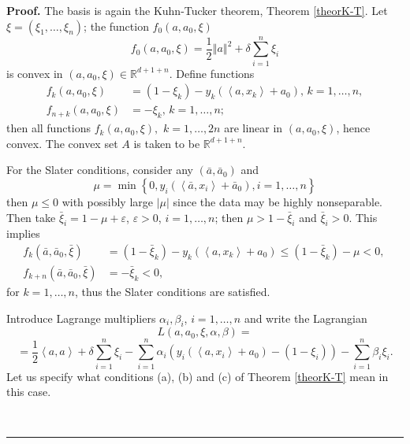 \documentclass[11pt,twoside]{article}%
\theoremstyle{change}
\newenvironment{proof}[1][Proof]{\textbf{#1.} }{\ \rule{0.5em}{0.5em}}
\begin{document}
\begin{proof}
The basis is again the Kuhn-Tucker theorem, Theorem \ref{theorK-T}. Let
$\xi=(\xi_{1},\ldots,\xi_{n})$; the function $f_{0}(a,a_{0},\xi)$
\[
f_{0}(a,a_{0},\xi)=\frac{1}{2}\left\Vert a\right\Vert ^{2}+\delta\sum
_{i=1}^{n}\xi_{i}%
\]
is convex in $(a,a_{0},\xi)\in\mathbb{R}^{d+1+n}$. Define functions
\begin{align*}
f_{k}(a,a_{0},\xi)  & =\left(  1-\xi_{k}\right)  -y_{k}\left(  \left\langle
a,x_{k}\right\rangle +a_{0}\right)  \text{, }k=1,\ldots,n,\\
f_{n+k}(a,a_{0},\xi)  & =-\xi_{k}\text{, }k=1,\ldots,n\text{;}%
\end{align*}
then all functions $f_{k}(a,a_{0},\xi),$ $k=1,\ldots,2n$ are linear in
$(a,a_{0},\xi)$, hence convex. The convex set $A$ is taken to be
$\mathbb{R}^{d+1+n}$.

For the Slater conditions, consider any $(\bar{a},\bar{a}_{0})$ and
\begin{equation}
\mu=\min\left\{  0,y_{i}\left(  \left\langle \bar{a},x_{i}\right\rangle
+\bar{a}_{0}\right)  ,i=1,\ldots,n\right\}
\end{equation}
then $\mu\leq0$ with possibly large $\left\vert \mu\right\vert $ since the
data may be highly nonseparable. Then take $\bar{\xi}_{i}=1-\mu+\varepsilon$,
$\varepsilon>0$, $i=1,\ldots,n$; then $\mu>1-\bar{\xi}_{i} $ and $\bar{\xi
}_{i}>0$. This implies
\begin{align*}
f_{k}(\bar{a},\bar{a}_{0},\bar{\xi})  & =\left(  1-\bar{\xi}_{k}\right)
-y_{k}\left(  \left\langle a,x_{k}\right\rangle +a_{0}\right)  \leq\left(
1-\bar{\xi}_{k}\right)  -\mu<0\text{, }\\
f_{k+n}(\bar{a},\bar{a}_{0},\bar{\xi})  & =-\bar{\xi}_{k}<0\text{, }%
\end{align*}
for $k=1,\ldots,n$, thus the Slater conditions are satisfied.

Introduce Lagrange multipliers $\alpha_{i},\beta_{i}$, $i=1,\ldots,n$ and
write the Lagrangian%
\[
L\left(  a,a_{0},\xi,\alpha,\beta\right)  =
\]%
\begin{equation}
=\frac{1}{2}\left\langle a,a\right\rangle +\delta\sum_{i=1}^{n}\xi_{i}%
-\sum_{i=1}^{n}\alpha_{i}\left(  y_{i}\left(  \left\langle a,x_{i}%
\right\rangle +a_{0}\right)  -\left(  1-\xi_{i}\right)  \right)  -\sum
_{i=1}^{n}\beta_{i}\xi_{i}.\label{Lagrange-1-slack}%
\end{equation}
Let us specify what conditions (a), (b) and (c) of Theorem \ref{theorK-T} mean
in this case.


\end{proof}
\end{document}
